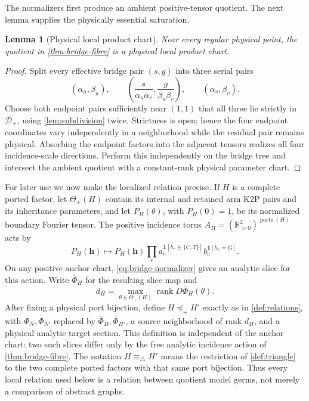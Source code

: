 \documentclass[11pt]{article}
\newtheorem{lemma}[theorem]{Lemma}
\theoremstyle{remark}
\newcommand{\Dplus}{\mathcal D_+}
\newcommand{\preceqplus}{\preceq_+}
\newcommand{\trianglerel}{\equiv_\triangle}
\newcommand{\1}{\mathbf 1}
\begin{document}
The normalizers first produce an ambient positive-tensor quotient.  The next
lemma supplies the physically essential saturation.

\begin{lemma}[Physical local product chart]\label{lem:physical-product}
Near every regular physical point, the quotient in
\cref{thm:bridge-fibre} is a physical local product chart.
\end{lemma}

\begin{proof}
Split every effective bridge pair \((s,g)\) into three serial pairs
\[
 (\alpha_u,\beta_u),\qquad
 \left(\frac{s}{\alpha_u\alpha_v},
       \frac{g}{\beta_u\beta_v}\right),\qquad
 (\alpha_v,\beta_v).
\]
Choose both endpoint pairs sufficiently near \((1,1)\) that all three lie
strictly in \(\Dplus\), using \cref{lem:subdivision} twice.  Strictness is
open; hence the four endpoint coordinates vary independently in a
neighborhood while the residual pair remains physical.  Absorbing the
endpoint factors into the adjacent tensors realizes all four incidence-scale
directions.  Perform this independently on the bridge tree and intersect the
ambient quotient with a constant-rank physical parameter chart.
\end{proof}

For later use we now make the localized relation precise.  If \(H\) is a
complete ported factor, let \(\Theta_+(H)\) contain its internal and retained
arm K2P pairs and its inheritance parameters, and let
\(P_H(\theta)\), with \(P_H(0)=1\), be its normalized boundary Fourier
tensor.  The positive incidence torus
\(A_H=(\mathbb R_{>0}^2)^{\operatorname{ports}(H)}\) acts by
\[
 P_H(\mathbf h)\longmapsto P_H(\mathbf h)
 \prod_e a_e^{\1[h_e\in\{C,T\}]}
          b_e^{\1[h_e=G]}.
\]
On any positive anchor chart, \eqref{eq:bridge-normalizer} gives an analytic
slice for this action.  Write \(\overline\Phi_H\) for the resulting slice map
and
\[
 d_H=\max_{\theta\in\Theta_+(H)}
       \operatorname{rank}D\overline\Phi_H(\theta).
\]
After fixing a physical port bijection, define \(H\preceqplus H'\) exactly as
in \cref{def:relations}, with \(\Phi_N,\Phi_{N'}\) replaced by
\(\overline\Phi_H,\overline\Phi_{H'}\), a source neighborhood of rank
\(d_H\), and a physical analytic target section.  This definition is
independent of the anchor chart: two such slices differ only by the free
analytic incidence action of \cref{thm:bridge-fibre}.  The notation
\(H\trianglerel H'\) means the restriction of \cref{def:triangle} to the two
complete ported factors with that same port bijection.  Thus every local
relation used below is a relation between quotient model germs, not merely a
comparison of abstract graphs.
\end{document}
